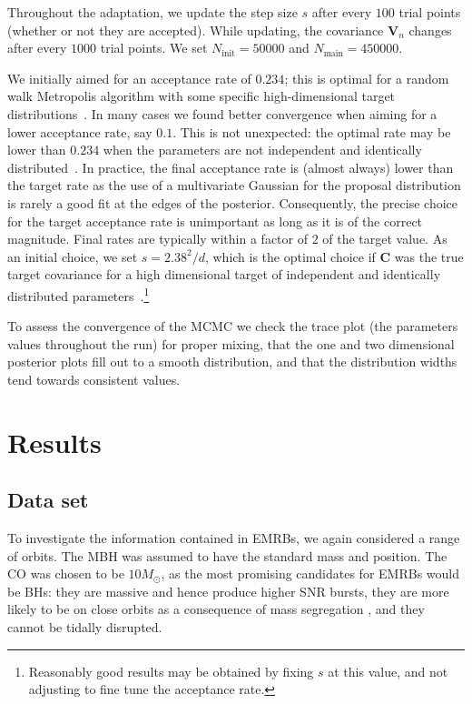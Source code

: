 \documentclass[useAMS,usedcolumn,usegraphicx,usenatbib]{mn2e}
\newcommand{\sub}[1]{\ensuremath{_\mathrm{#1}}}
\begin{document}
Throughout the adaptation, we update the step size $s$ after every $100$ trial points (whether or not they are accepted). While updating, the covariance $\boldsymbol{V}_n$ changes after every $1000$ trial points. We set $N\sub{init} = 50000$ and $N\sub{main} = 450000$.

We initially aimed for an acceptance rate of $0.234$; this is optimal for a random walk Metropolis algorithm with some specific high-dimensional target distributions~\citep{Roberts1997,Roberts2001}. In many cases we found better convergence when aiming for a lower acceptance rate, say $0.1$. This is not unexpected: the optimal rate may be lower than $0.234$ when the parameters are not independent and identically distributed~\citep{Bedard2007, Bedard2008, Bedard2008a}. In practice, the final acceptance rate is (almost always) lower than the target rate as the use of a multivariate Gaussian for the proposal distribution is rarely a good fit at the edges of the posterior. Consequently, the precise choice for the target acceptance rate is unimportant as long as it is of the correct magnitude. Final rates are typically within a factor of $2$ of the target value. As an initial choice, we set $s = 2.38^2/d$, which is the optimal choice if $\boldsymbol{C}$ was the true target covariance for a high dimensional target of independent and identically distributed parameters~\citep{Gelman1996,Roberts1997,Roberts2001,Haario2001}.\footnote{Reasonably good results may be obtained by fixing $s$ at this value, and not adjusting to fine tune the acceptance rate.}

To assess the convergence of the MCMC we check the trace plot (the parameters values throughout the run) for proper mixing, that the one and two dimensional posterior plots fill out to a smooth distribution, and that the distribution widths tend towards consistent values.

\section{Results}\label{sec:Results}

\subsection{Data set}

To investigate the information contained in EMRBs, we again considered a range of orbits. The MBH was assumed to have the standard mass and position. The CO was chosen to be $10 M_\odot$, as the most promising candidates for EMRBs would be BHs: they are massive and hence produce higher SNR bursts, they are more likely to be on close orbits as a consequence of mass segregation \citep{Bahcall1977, Alexander2009, Preto2010, Amaro-Seoane2011d}, and they cannot be tidally disrupted.
\end{document}
